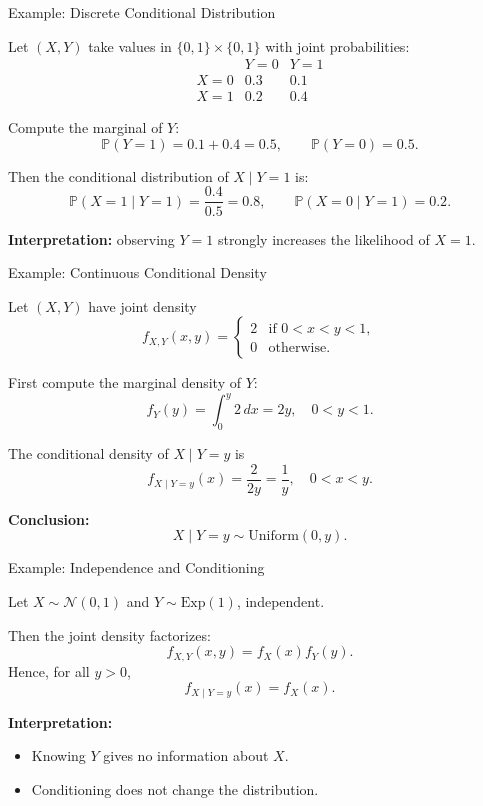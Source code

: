 \documentclass[10pt,aspectratio=169]{beamer}
\begin{document}
\begin{frame}{Example: Discrete Conditional Distribution}

Let \((X,Y)\) take values in \(\{0,1\}\times\{0,1\}\) with joint probabilities:\pause
\[
\begin{array}{c|cc}
 & Y=0 & Y=1 \\ \hline
X=0 & 0.3 & 0.1 \\
X=1 & 0.2 & 0.4
\end{array}
\]
\pause
\medskip

Compute the marginal of \(Y\):\pause
\[
\mathbb{P}(Y=1)=0.1+0.4=0.5,
\qquad
\mathbb{P}(Y=0)=0.5.
\]
\pause
\medskip

Then the conditional distribution of \(X\mid Y=1\) is:\pause
\[
\mathbb{P}(X=1\mid Y=1)=\frac{0.4}{0.5}=0.8,
\qquad
\mathbb{P}(X=0\mid Y=1)=0.2.
\]
\pause

\medskip
\textbf{Interpretation:}\pause
observing \(Y=1\) strongly increases the likelihood of \(X=1\).

\end{frame}

\begin{frame}{Example: Continuous Conditional Density}

Let \((X,Y)\) have joint density
\[
f_{X,Y}(x,y)=
\begin{cases}
2 & \text{if } 0<x<y<1,\\
0 & \text{otherwise.}
\end{cases}
\]\pause

\medskip

First compute the marginal density of \(Y\):\pause
\[
f_Y(y)=\int_0^y 2\,dx = 2y,
\quad 0<y<1.
\]
\pause
\medskip

The conditional density of \(X\mid Y=y\) is\pause
\[
f_{X\mid Y=y}(x)=\frac{2}{2y}=\frac{1}{y},
\quad 0<x<y.
\]
\pause

\textbf{Conclusion:}\pause
\[
X\mid Y=y \sim \mathrm{Uniform}(0,y).
\]

\end{frame}

\begin{frame}{Example: Independence and Conditioning}

Let \(X\sim \mathcal{N}(0,1)\) and \(Y\sim \mathrm{Exp}(1)\), independent.\pause

\medskip
Then the joint density factorizes:\pause
\[
f_{X,Y}(x,y)=f_X(x)f_Y(y).
\]
\pause
Hence, for all \(y>0\),\pause
\[
f_{X\mid Y=y}(x)=f_X(x).
\]
\pause
\medskip

\textbf{Interpretation:}\pause
\begin{itemize}
  \item Knowing \(Y\) gives no information about \(X\).\pause
  \item Conditioning does not change the distribution.\pause
\end{itemize}

\end{frame}
\end{document}

